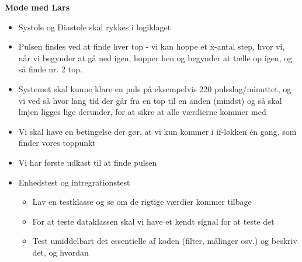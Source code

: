 \documentclass[a4paper,11pt,oneside]{memoir}
\newcommand{\R}{\ensuremath{\mathbb{R}}}
\begin{document}
\textbf{Møde med Lars}
\begin{itemize}
\item Systole og Diastole skal rykkes i logiklaget 
\item Pulsen findes ved at finde hver top - vi kan hoppe et x-antal step, hvor vi, når vi begynder at gå ned igen, hopper hen og begynder at tælle op igen, og så finde nr. 2 top. 
\item Systemet skal kunne klare en puls på eksempelvis 220 pulsslag/minuttet, og vi ved så hvor lang tid der går fra en top til en anden (mindst) og så skal linjen ligges lige derunder, for at sikre at alle værdierne kommer med
\item Vi skal have en betingelse der gør, at vi kun kommer i if-løkken én gang, som finder vores toppunkt
\item Vi har første udkast til at finde pulsen
\item Enhedstest og intregrationstest
\begin{itemize}
\item Lav en testklasse og se om de rigtige værdier kommer tilbage 
\item For at teste dataklassen skal vi have et kendt signal for at teste det 
\item Test umiddelbart det essentielle af koden (filter, målinger osv.) og beskriv det, og hvordan 
\end{itemize}
\end{itemize}

\newpage






\end{document}
